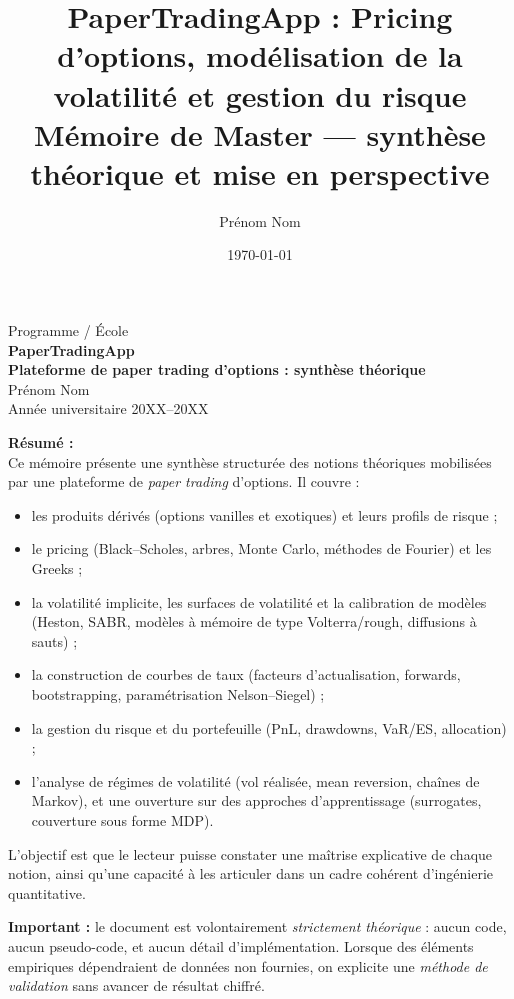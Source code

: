 \documentclass[11pt,a4paper]{article}
\title{\vspace{-2cm}%
    \textbf{PaperTradingApp : Pricing d'options, mod\'elisation de la volatilit\'e et gestion du risque}\\[0.3cm]
    \large M\'emoire de Master --- synth\`ese th\'eorique et mise en perspective
}
\author{Pr\'enom Nom}
\date{\today}
\newcommand{\1}{\mathbf{1}}
\begin{document}
\begin{titlepage}
    \centering
    \vspace*{2cm}
    {\Large Programme / \'Ecole}\\[0.7cm]
    {\huge \bfseries PaperTradingApp\\[0.3cm]
    Plateforme de paper trading d'options : synth\`ese th\'eorique}\\[2cm]
    {\large Pr\'enom Nom}\\[0.5cm]
    {\large Ann\'ee universitaire 20XX--20XX}\\[3cm]

    \vfill
    \begin{flushleft}
    \textbf{R\'esum\'e :}\\[0.2cm]
    Ce m\'emoire pr\'esente une synth\`ese structur\'ee des notions th\'eoriques mobilis\'ees
    par une plateforme de \emph{paper trading} d'options. Il couvre :
    \begin{itemize}
      \item les produits d\'eriv\'es (options vanilles et exotiques) et leurs profils de risque ;
      \item le pricing (Black--Scholes, arbres, Monte Carlo, m\'ethodes de Fourier) et les Greeks ;
      \item la volatilit\'e implicite, les surfaces de volatilit\'e et la calibration de mod\`eles
            (Heston, SABR, mod\`eles \`a m\'emoire de type Volterra/rough, diffusions \`a sauts) ;
      \item la construction de courbes de taux (facteurs d'actualisation, forwards, bootstrapping,
            param\'etrisation Nelson--Siegel) ;
      \item la gestion du risque et du portefeuille (PnL, drawdowns, VaR/ES, allocation) ;
      \item l'analyse de r\'egimes de volatilit\'e (vol r\'ealis\'ee, mean reversion, cha\^ines de Markov),
            et une ouverture sur des approches d'apprentissage (surrogates, couverture sous forme MDP).
    \end{itemize}
    L'objectif est que le lecteur puisse constater une ma\^{i}trise explicative de chaque notion,
    ainsi qu'une capacit\'e \`a les articuler dans un cadre coh\'erent d'ing\'enierie quantitative.

    \medskip
    \textbf{Important :} le document est volontairement \emph{strictement th\'eorique} : aucun code,
    aucun pseudo-code, et aucun d\'etail d'impl\'ementation. Lorsque des \'el\'ements empiriques
    d\'ependraient de donn\'ees non fournies, on explicite une \emph{m\'ethode de validation} sans
    avancer de r\'esultat chiffr\'e.
    \end{flushleft}

    \vfill
\end{titlepage}
\end{document}
